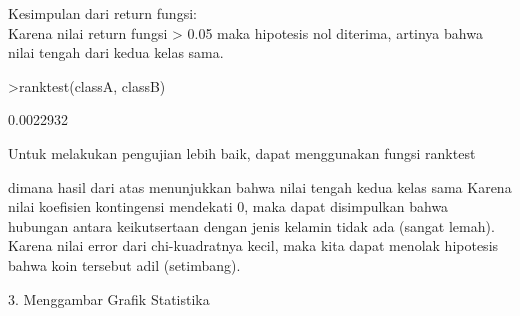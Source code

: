 \documentclass[a4paper,10pt]{article}
\begin{document}
\begin{eulernotebook}
\begin{eulercomment}
\begin{eulercomment}
\begin{eulercomment}
\begin{eulercomment}
\begin{eulercomment}
\begin{eulercomment}
\begin{eulercomment}
\begin{eulercomment}
\begin{eulercomment}
\begin{eulercomment}
\begin{eulercomment}
\begin{eulercomment}
\begin{eulercomment}
\begin{eulercomment}
\begin{eulercomment}
\begin{eulercomment}
\begin{eulercomment}
\begin{eulercomment}
\begin{eulercomment}
\begin{eulercomment}
\begin{eulercomment}
\begin{eulercomment}
\begin{eulercomment}
\begin{eulercomment}
\begin{eulercomment}
\begin{eulercomment}
\begin{eulercomment}
\begin{eulercomment}
\begin{eulercomment}
\begin{eulercomment}
\begin{eulercomment}
\begin{eulercomment}
\begin{eulercomment}
\begin{eulercomment}
\begin{eulercomment}
\begin{eulercomment}
\begin{eulercomment}
\begin{eulercomment}
\begin{eulercomment}
\begin{eulercomment}
\begin{eulercomment}
\begin{eulercomment}
\begin{eulercomment}
\begin{eulercomment}
\begin{eulercomment}
\begin{eulercomment}
\begin{eulercomment}
\begin{eulercomment}
\begin{eulercomment}
\begin{eulercomment}
\begin{eulercomment}
Kesimpulan dari return fungsi:\\
Karena nilai return fungsi \textgreater{} 0.05 maka hipotesis nol diterima, artinya
bahwa nilai tengah dari kedua kelas sama.
\end{eulercomment}
\begin{eulerprompt}
>ranktest(classA, classB)
\end{eulerprompt}
\begin{euleroutput}
  0.0022932
\end{euleroutput}
\begin{eulercomment}
Untuk melakukan pengujian lebih baik, dapat menggunakan fungsi
ranktest

dimana hasil dari atas menunjukkan bahwa nilai tengah kedua kelas sama
Karena nilai koefisien kontingensi mendekati 0, maka dapat disimpulkan
bahwa hubungan antara keikutsertaan dengan jenis kelamin tidak ada
(sangat lemah). Karena nilai error dari chi-kuadratnya kecil, maka
kita dapat menolak hipotesis bahwa koin tersebut adil (setimbang).

3. Menggambar Grafik Statistika



\end{eulercomment}
\end{eulercomment}
\end{eulercomment}
\end{eulercomment}
\end{eulercomment}
\end{eulercomment}
\end{eulercomment}
\end{eulercomment}
\end{eulercomment}
\end{eulercomment}
\end{eulercomment}
\end{eulercomment}
\end{eulercomment}
\end{eulercomment}
\end{eulercomment}
\end{eulercomment}
\end{eulercomment}
\end{eulercomment}
\end{eulercomment}
\end{eulercomment}
\end{eulercomment}
\end{eulercomment}
\end{eulercomment}
\end{eulercomment}
\end{eulercomment}
\end{eulercomment}
\end{eulercomment}
\end{eulercomment}
\end{eulercomment}
\end{eulercomment}
\end{eulercomment}
\end{eulercomment}
\end{eulercomment}
\end{eulercomment}
\end{eulercomment}
\end{eulercomment}
\end{eulercomment}
\end{eulercomment}
\end{eulercomment}
\end{eulercomment}
\end{eulercomment}
\end{eulercomment}
\end{eulercomment}
\end{eulercomment}
\end{eulercomment}
\end{eulercomment}
\end{eulercomment}
\end{eulercomment}
\end{eulercomment}
\end{eulercomment}
\end{eulercomment}
\end{eulernotebook}
\end{document}
